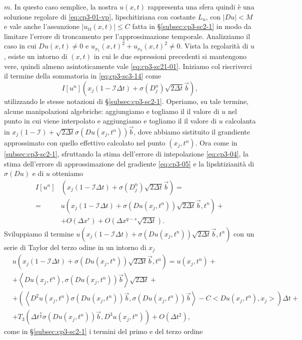 $m$. In questo caso semplice, la nostra $u(x,t)$ rappresenta una sfera
quindi è una soluzione regolare di \eqref{eq:cp3-01-vp},
lipschitiziana con costante $L_u$, con $|Du|<M$ e vale anche
l'assunzione $|u_{tt}(x,t)|\leq C$ fatta in §\ref{subsec:cp3-sc2-1} in modo
da limitare l'errore di troncamento per l'approssimazione
temporale. Analizziamo il caso in cui $Du(x,t)\ne 0$ e
$u_{x_1}(x,t)^2+u_{x_3}(x,t)^2\ne 0$. Vista la regolarità di $u$,
esiste un intorno di $(x,t)$ in cui le due espressioni precedenti si
mantengono vere, quindi almeno asintoticamente vale
\eqref{eq:cp3-sc21-01}.  Iniziamo col riscriverci il termine della
sommatoria in \eqref{eq:cp3-sc3-14} come
\[
I[u^n](x_j(1-\mathcal{I}\Delta t)+\sigma(D_j^n)\sqrt{2\Delta t}\vec{b}),
\]
utilizzando le stesse notazioni di §\ref{subsec:cp3-sc2-1}. Operiamo,
su tale termine, alcune manipolazioni algebriche: aggiungiamo e togliamo
il il valore di $u$ nel punto in cui viene interpolato e aggiungiamo e
togliamo il il valore di $u$ calcolanta in
$x_j(1-\mathcal{I})+\sqrt{2\Delta t}\sigma(Du(x_j,t^n))\vec{b}$, dove
abbiamo sistituito il grandiente approssimato con quello effettivo
calcolato nel punto $(x_j,t^n)$. Ora come in \ref{subsec:cp3-sc2-1},
sfruttando la stima dell'errore di intepolazione \eqref{eq:cp3-04}, la
stima dell'errore di approssimazione del gradiente \eqref{eq:cp3-05} e
la lipshtizianità di $\sigma(Du)$ e di $u$ otteniamo
\[
\begin{split}
I[u^n]&(x_j(1-\mathcal{I}\Delta t)+\sigma(D_j^n)\sqrt{2\Delta
    t}\vec{b})=\\
=&u(x_j(1-\mathcal{I}\Delta t) +\sigma(Du(x_j,t^n))\sqrt{2\Delta t}\vec{b},t^n) +\\
&+O(\Delta x^r)+O(\Delta x^{q-s}\sqrt{2\Delta t}).
\end{split}
\]
Sviluppiamo il termine $u(x_j(1-\mathcal{I}\Delta t)
+\sigma(Du(x_j,t^n))\sqrt{2\Delta t}\vec{b},t^n)$ con un serie di
Taylor del terzo odine in un intorno di $x_j$
\[
\begin{split}
&u(x_j(1-\mathcal{I}\Delta t)+\sigma(Du(x_j,t^n))\sqrt{2\Delta t}\vec{b},t^n) = u(x_j,t^n)+ \\
&+\left<Du(x_j,t^n),\sigma(Du(x_j,t^n))\vec{b}\right>\sqrt{2\Delta t} +\\
&+\left(\left<D^2u(x_j,t^n)\sigma(Du(x_j,t^n))\vec{b},\sigma(Du(x_j,t^n))\vec{b}\right>-C<Du(x_j,t^n),x_j>\right)\Delta t + \\
&+T_3(\Delta t^{\frac{3}{2}}\sigma(Du(x_j,t^n))\vec{b},D^3u(x_j,t^n))+O(\Delta t^2), 
\end{split}
\]
come in §\ref{subsec:cp3-sc2-1} i termini del primo e del terzo ordine
